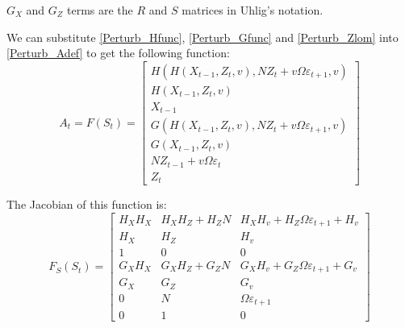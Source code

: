 \documentclass[letterpaper,12pt]{article}
\newcommand{\ve}{\varepsilon}
\theoremstyle{definition}
\begin{document}
\begin{spacing}{1.5}
		$G_X$ and $G_Z$ terms are the $R$ and $S$ matrices in Uhlig's notation.

		We can substitute \eqref{Perturb_Hfunc}, \eqref{Perturb_Gfunc} and \eqref{Perturb_Zlom} into \eqref{Perturb_Adef} to get the following function:
		\begin{equation} \label{Perturb_Ffunc}
			A_t = F(S_t) = \begin{bmatrix}
			H \left( H(X_{t-1},Z_t,v), N Z_t + v \Omega \ve_{t+1}, v \right) \\
			H(X_{t-1},Z_t,v) \\ 
			X_{t-1} \\ 
			G \left( H(X_{t-1},Z_t,v), N Z_t + v \Omega \ve_{t+1}, v \right) \\ 
			G(X_{t-1},Z_t,v) 
			\\ N Z_{t-1} + v \Omega \ve_t 
			\\ Z_t \end{bmatrix}
		\end{equation}

		The Jacobian of this function is:
		\begin{equation} \label{Perturb_Fderiv1}
			F_S(S_t) = \begin{bmatrix} H_X H_X & 
			H_X H_Z + H_Z N & 
			H_X H_v + H_Z \Omega \ve_{t+1} + H_v \\ 
			H_X & H_Z & H_v \\ 1 & 0 & 0 \\ 
			G_X H_X & 
			G_X H_Z + G_Z N & 
			G_X H_v + G_Z \Omega \ve_{t+1} + G_v \\ 
			G_X & G_Z & G_v \\ 0 & N & \Omega \ve_{t+1} \\ 
			0 & 1 & 0 \end{bmatrix}
		\end{equation}


\end{spacing}
\end{document}

